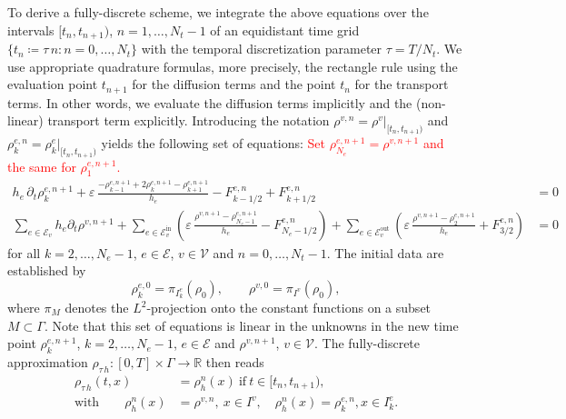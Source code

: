 To derive a fully-discrete scheme, we integrate the above equations over the intervals $[t_n, t_{n+1})$, $n=1, \ldots, N_t-1$ of an equidistant time grid $\{ t_n \coloneqq \tau\,n \colon n = 0, \ldots, N_t \}$ with the temporal discretization parameter $\tau = T / N_t$. We use appropriate quadrature formulas, more precisely, the rectangle rule using the evaluation point $t_{n+1}$ for the diffusion terms and the point $t_n$ for the transport terms. In other words, we evaluate the diffusion terms implicitly and the (non-linear) transport term explicitly. Introducing the notation $\rho^{v,n} = \rho^v|_{[t_n,t_{n+1})}$ and $\rho_k^{e,n} = \rho_k^e|_{[t_n,t_{n+1})}$ yields the following set of equations: \textcolor{red}{Set $\rho^{e,n+1}_{N_e} = \rho^{v,n+1}$ and the same for $\rho^{e,n+1}_1$.}
\begin{subequations}
    \label{eq:fully_discrete_fvm}
    \begin{align}
        h_e\,\partial_t \rho_k^{e,n+1} + \varepsilon\,\frac{-\rho_{k-1}^{e,n+1} +
        2\rho_k^{e,n+1} - \rho_{k+1}^{e,n+1}}{h_e} - F_{k-1/2}^{e,n} +
        F_{k+1/2}^{e,n} &= 0 \\	
        \sum_{e\in \mathcal{E}_v} h_e\partial_t\rho^{v,n+1}
        + \sum_{e\in \mathcal{E}_v^{\text{in}}}
        \left(\varepsilon\,\frac{\rho^{v,n+1}-\rho_{N_e-1}^{e,n+1}}{h_e} -
        F^{e,n}_{N_e-1/2}\right)
        + \sum_{e\in \mathcal{E}_v^{\text{out}}}
        \left(\varepsilon\,\frac{\rho^{v,n+1}-\rho_2^{e,n+1}}{h_e} + F^{e,n}_{3/2}\right)
        &= 0
    \end{align}
\end{subequations}
for all $k = 2, \ldots, N_e-1$, $e \in \mathcal{E}$, $v \in \mathcal{V}$ and $n = 0, \ldots, N_t - 1$. The initial data are established by
\begin{equation*}
	\rho_k^{e,0}=\pi_{I_k^e}(\rho_0),\qquad \rho^{v,0} = \pi_{I^v}(\rho_0),
\end{equation*}
where $\pi_M$ denotes the $L^2$-projection onto the constant functions on a subset $M \subset \Gamma$. Note that this set of equations is linear in the unknowns in the new time point $\rho_k^{e,n+1}$, $k = 2, \ldots, N_e-1$, $ e \in \mathcal{E}$ and $\rho^{v,n+1}$, $v \in \mathcal{V}$. The fully-discrete approximation $\rho_{\tau\,h}\colon [0,T]\times \Gamma\to \mathbb{R}$ then reads
\begin{align*}
	\rho_{\tau\,h}(t,x) &= \rho_h^n(x)\ \text{if}\ t\in [t_n,t_{n+1}),\\
	\text{with}\qquad \rho_h^n(x) &= \rho^{v,n},\ x\in I^v,\quad \rho_h^n(x)
	= \rho_k^{e,n}, x\in I_k^e.
\end{align*}

